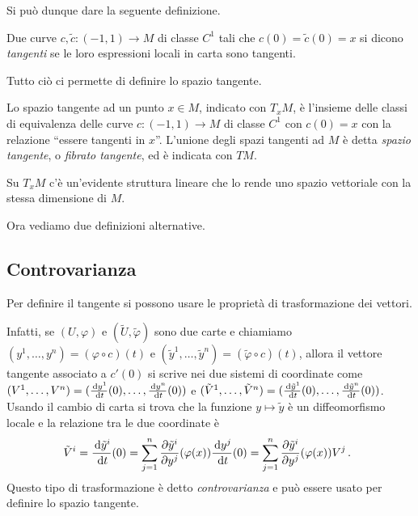 Si può dunque dare la seguente definizione.
 
\begin{definition} 
	Due curve $c,\tilde{c}:(-1,1)\to M$ di classe $C^1$ tali che $c(0)=\tilde{c}(0)=x$ si dicono \emph{tangenti} se le loro espressioni locali in carta sono tangenti.
\end{definition}

Tutto ciò ci permette di definire lo spazio tangente.
 
\begin{definition}  
	Lo spazio tangente ad un punto $x\in M$, indicato con $T_xM$, è l'insieme delle classi di equivalenza delle curve $c:(-1,1)\to M$ di classe $C^1$ con $c(0)=x$ con la relazione ``essere tangenti in $x$''. L'unione degli spazi tangenti ad $M$ è detta \emph{spazio tangente}, o \emph{fibrato tangente}, ed è indicata con $TM$.
\end{definition}
 
 \begin{remark}
  Su $T_xM$ c'è un'evidente struttura lineare che lo rende uno spazio vettoriale con la
  stessa dimensione di $M$.
 \end{remark}

Ora vediamo due definizioni alternative.
 
\subsection*{Controvarianza}
Per definire il tangente si possono usare le proprietà di trasformazione dei vettori.

Infatti, se $(U,\varphi)$ e $(\tilde{U},\tilde{\varphi})$ sono due carte e chiamiamo $(y^1,\dots,y^n)=(\varphi\circ c)(t)$ e $(\tilde{y}^1,\dots,\tilde{y}^n)=(\tilde{\varphi}\circ c)(t)$, allora il vettore tangente associato a $c'(0)$ si scrive nei due sistemi di coordinate come $(V^1,\dots,V^n)=(\frac{\,\mathrm d y^1}{\,\mathrm d t}(0),\dots,\frac{\,\mathrm d y^n}{\,\mathrm d t}(0))$ e $(\tilde{V}^1,\dots,\tilde{V}^n)=(\frac{\,\mathrm d\tilde{y}^1}{\,\mathrm d t}(0),\dots,\frac{\,\mathrm d\tilde{y}^n}{\,\mathrm d t}(0))$.
Usando il cambio di carta si trova che la funzione $y\mapsto\tilde{y}$ è un diffeomorfismo locale e la relazione tra le due coordinate è 
\begin{equation*}
	\tilde{V}^i=\frac{\,\mathrm d\tilde{y}^i}{\,\mathrm d t}(0)=\sum_{j=1}^n\frac{\partial\tilde{y}^i}{\partial y^j}(\varphi(x)) \frac{\,\mathrm d y^j}{\,\mathrm d t}(0)=\sum_{j=1}^n\frac{\partial\tilde{y}^i}{\partial y^j}(\varphi(x))V^j\, \text{. }
\end{equation*}
Questo tipo di trasformazione è detto \emph{controvarianza} e può essere usato per definire lo spazio tangente. 

